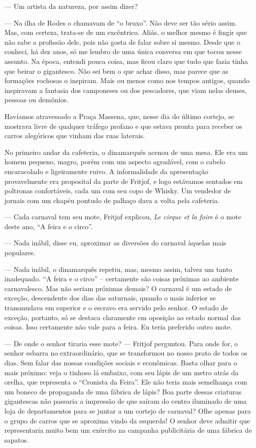 --- Um artista da natureza, por assim dizer?

--- Na ilha de Rodes o chamavam de ``o bruxo''. Não deve ser tão sério
assim. Mas, com certeza, trata-se de um excêntrico. Aliás, o melhor
mesmo é fingir que não sabe a profissão dele, pois não gosta de falar
sobre si mesmo. Desde que o conheci, há dez anos, só me lembro de uma
única conversa em que tocou nesse assunto. Na época, entendi pouca
coisa, mas ficou claro que tudo que fazia tinha que beirar o gigantesco.
Não sei bem o que achar disso, mas parece que as formações rochosas o
inspiram. Mais ou menos como nos tempos antigos, quando inspiravam a
fantasia dos camponeses ou dos pescadores, que viam nelas deuses,
pessoas ou demônios.

Havíamos atravessado a Praça Massena, que, nesse dia do último cortejo,
se mostrava livre de qualquer tráfego profano e que estava pronta para
receber os carros alegóricos que vinham das ruas laterais.

No primeiro andar da cafeteria, o dinamarquês acenou de uma mesa. Ele
era um homem pequeno, magro, porém com um aspecto agradável, com o
cabelo encaracolado e ligeiramente ruivo. A informalidade da
apresentação provavelmente era proposital da parte de Fritjof, e logo
estávamos sentados em poltronas confortáveis, cada um com seu copo de
Whisky. Um vendedor de jornais com um chapéu pontudo de palhaço dava a
volta pela cafeteria.

--- Cada carnaval tem seu mote, Fritjof explicou, \emph{Le cirque et la
foire} é o mote deste ano, ``A feira e o circo''.

--- Nada inábil, disse eu, aproximar as diversões do carnaval àquelas
mais populares.

--- Nada inábil, o dinamarquês repetiu, mas, mesmo assim, talvez um tanto
inadequado. ``A feira e o circo'' -- certamente são coisas próximas ao
ambiente carnavalesco. Mas não seriam próximas demais? O carnaval é um
estado de exceção, descendente dos dias das saturnais, quando o mais
inferior se transmudava em superior e o escravo era servido pelo senhor.
O estado de exceção, portanto, só se destaca claramente em oposição ao
estado normal das coisas. Isso certamente não vale para a feira. Eu
teria preferido outro mote.

--- De onde o senhor tiraria esse mote? --- Fritjof perguntou. Para onde
for, o senhor esbarra no extraordinário, que se transformou no nosso
prato de todos os dias. Sem falar das nossas condições sociais e
econômicas. Basta olhar para o mais próximo: veja o tinhoso lá embaixo,
com seu lápis de um metro atrás da orelha, que representa o ``Cronista
da Feira''. Ele não teria mais semelhança com um boneco de propaganda de
uma fábrica de lápis? Boa parte dessas criaturas gigantescas não
passaria a impressão de que saíram do centro iluminado de uma loja de
departamentos para se juntar a um cortejo de carnaval? Olhe apenas para
o grupo de carros que se aproxima vindo da esquerda! O senhor deve
admitir que representaria muito bem um exército na campanha publicitária
de uma fábrica de sapatos.

